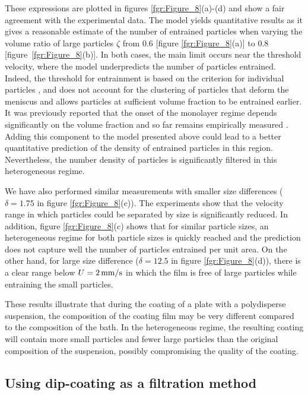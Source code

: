 \documentclass{jfm}
\begin{document}
These expressions are plotted in figures \ref{fgr:Figure_8}(a)-(d) and show a fair agreement with the experimental data. The model yields quantitative results as it gives a reasonable estimate of the number of entrained particles when varying the volume ratio of large particles $\zeta$ from $0.6$ [figure  \ref{fgr:Figure_8}(a)] to $0.8$ [figure~\ref{fgr:Figure_8}(b)]. In both cases, the main limit occurs near the threshold velocity, where the model underpredicts the number of particles entrained. Indeed, the threshold for entrainment is based on the criterion for individual particles \cite[][]{colosqui2013hydrodynamically,sauret2019capillary}, and does not account for the clustering of particles that deform the meniscus and allows particles at sufficient volume fraction to be entrained earlier. It was previously reported that the onset of the monolayer regime depends significantly on the volume fraction and so far remains empirically measured \cite[][]{palma2019dip}. Adding this component to the model presented above could lead to a better quantitative prediction of the density of entrained particles in this region. Nevertheless, the number density of particles is significantly filtered in this heterogeneous regime.

We have also performed similar measurements with smaller size differences  ($\delta=1.75$ in figure \ref{fgr:Figure_8}(c)). The experiments show that the velocity range in which particles could be separated by size is significantly reduced. In addition, figure \ref{fgr:Figure_8}(c) shows that for similar particle sizes, an heterogeneous regime for both particle sizes is quickly reached and the prediction does not capture well the number of particles entrained per unit area. On the other hand, for large size difference ($\delta=12.5$ in figure \ref{fgr:Figure_8}(d)), there is a clear range below $U=2\,{\rm mm/s}$ in which the film is free of large particles while entraining the small particles.

These results illustrate that during the coating of a plate with a polydisperse suspension, the composition of the coating film may be very different compared to the composition of the bath. In the heterogeneous regime, the resulting coating will contain more small particles and fewer large particles than the original composition of the suspension, possibly compromising the quality of the coating.

\subsection{Using dip-coating as a filtration method}
\end{document}
